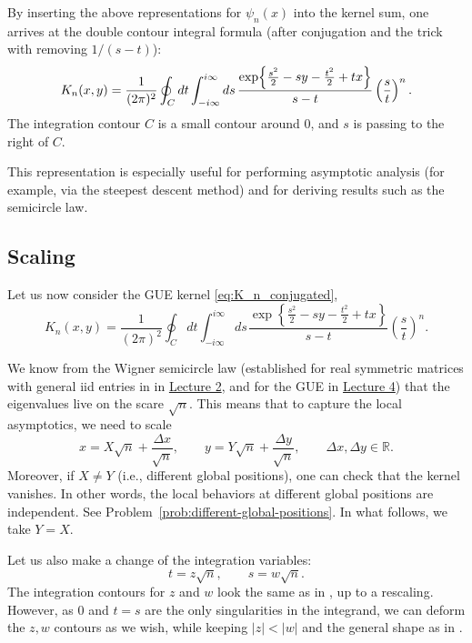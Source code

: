 \documentclass[letterpaper,11pt,oneside,reqno]{article}
\numberwithin{equation}{section}
\newcommand{\ssp}{\hspace{1pt}}
\theoremstyle{definition}
\begin{document}
By inserting the above representations for \(\psi_n(x)\) into the kernel sum, one arrives at the double contour integral formula
(after conjugation and the trick with removing $1 / (s-t)$):
\[
K_n(x,y)=\frac{1}{(2\pi)^2}
\oint_C dt\int_{-i\infty}^{i\infty}ds\,
\frac{\exp\Bigl\{\frac{s^2}{2}-sy-\frac{t^2}{2}+tx\Bigr\}}{s-t}\left(\frac{s}{t}\right)^n.
\]
The integration contour $C$ is a small contour around $0$, and 
$s$ is passing to the right of $C$.

This representation is especially useful for performing asymptotic analysis (for example, via the steepest descent method) and for deriving results such as the semicircle law.


\subsection{Scaling}
\label{sub:scaling}

Let us now consider the GUE kernel
\eqref{eq:K_n_conjugated},
\begin{equation*}
	K_n(x,y)=\frac{1}{(2\pi)^2}
	\oint_C dt\int_{-i\infty}^{i\infty}ds\ssp
	\frac{\exp\left\{ \frac{s^2}{2}-sy-\frac{t^2}{2}+tx \right\}}{s-t}\left( \frac{s}{t} \right)^n
	.
\end{equation*}

We know from the Wigner semicircle law
(established for real symmetric matrices with general iid entries in
in \href{https://lpetrov.cc/rmt25/rmt25-notes/rmt2025-l02.pdf}{Lecture 2},
and for the GUE in \href{https://lpetrov.cc/rmt25/rmt25-notes/rmt2025-l04.pdf}{Lecture 4})
that the eigenvalues live on the scare $\sqrt n$. This means that to capture the local asymptotics,
we need to scale
\begin{equation}
	\label{eq:scaling_x-y}
	x=X\sqrt n+\frac{\Delta x}{\sqrt n},\qquad y=Y\sqrt n+\frac{\Delta y}{\sqrt n},\qquad
	\Delta x,\Delta y\in\mathbb{R}.
\end{equation}
Moreover, if $X\ne Y$ (i.e., different global positions), one can check that the kernel
vanishes. In other words, the local behaviors at different global positions are independent.
See Problem~\ref{prob:different-global-positions}.
In what follows, we take $Y=X$.

Let us also make a change of the integration variables:
\begin{equation*}
	t=z\sqrt n,\qquad s=w\sqrt n.
\end{equation*}
The integration contours for $z$ and $w$ look the same as in
, up to a rescaling. However, as $0$
and $t=s$
are the only singularities in the integrand, we can deform the $z,w$
contours as we wish, while keeping $|z|<|w|$
and the general shape as in .
\end{document}
